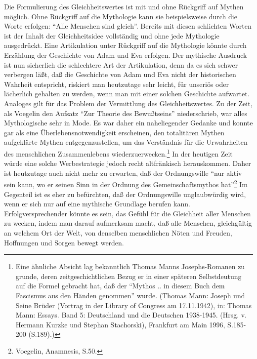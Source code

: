 Die Formulierung des Gleichheitswertes ist mit und ohne Rückgriff auf
Mythen möglich. Ohne Rückgriff auf die Mythologie kann sie
beispielsweise durch die Worte erfolgen: "`Alle Menschen sind gleich"'.
Bereits mit diesen schlichten Worten ist der Inhalt der Gleichheitsidee
vollständig und ohne jede Mythologie ausgedrückt. Eine Artikulation
unter Rückgriff auf die Mythologie könnte durch Erzählung der Geschichte
von Adam und Eva erfolgen. Der mythische Ausdruck ist nun sicherlich die
schlechtere Art der Artikulation, denn da es sich schwer verbergen läßt,
daß die Geschichte von Adam und Eva nicht der historischen Wahrheit
entspricht, riskiert man heutzutage sehr leicht, für unseriös oder
lächerlich gehalten zu werden, wenn man mit einer solchen Geschichte
aufwartet. Analoges gilt für das Problem der Vermittlung des
Gleichheitswertes. Zu der Zeit, als Voegelin den Aufsatz "`Zur Theorie
des Bewußtseins"' niederschrieb, war alles Mythologische sehr in Mode.
Es war daher ein naheliegender Gedanke und konnte gar als eine
Überlebensnotwendigkeit erscheinen, den totalitären Mythen aufgeklärte
Mythen entgegenzustellen, um das Verständnis für die Urwahrheiten des
menschlichen Zusammenlebens wiederzuerwecken.\footnote{Eine ähnliche
  Absicht lag bekanntlich Thomas Manns Josephs-Romanen zu grunde, deren
  zeitgeschichtlichen Bezug er in einer späteren Selbstdeutung auf die
  Formel gebracht hat, daß der "`Mythos .. in diesem Buch dem Fascismus
  aus den Händen genommen"' wurde.  (Thomas Mann: Joseph und Seine
  Brüder (Vortrag in der Library of Congress am 17.11.1942), in: Thomas
  Mann: Essays. Band 5: Deutschland und die Deutschen 1938-1945. (Hrsg.
  v. Hermann Kurzke und Stephan Stachorski), Frankfurt am Main 1996,
  S.185-200 (S.189).)}  In der heutigen Zeit würde eine solche
Werbestrategie jedoch recht altfränkisch herauskommen. Daher ist
heutzutage auch nicht mehr zu erwarten, daß der Ordnungswille "`nur
aktiv sein kann, wo er seinen Sinn in der Ordnung des
Gemeinschaftsmythos hat"'\footnote{Voegelin, Anamnesis, S.50.} Im
Gegenteil ist es eher zu befürchten, daß der Ordnungswille unglaubwürdig
wird, wenn er sich nur auf eine mythische Grundlage berufen kann.
Erfolgversprechender könnte es sein, das Gefühl für die Gleichheit aller
Menschen zu wecken, indem man darauf aufmerksam macht, daß alle
Menschen, gleichgültig an welchem Ort der Welt, von denselben
menschlichen Nöten und Freuden, Hoffnungen und Sorgen bewegt werden.


